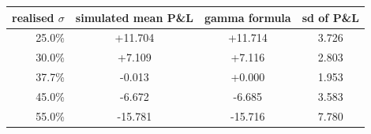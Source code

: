 \begin{tabular}{rccc}
\toprule
realised $\sigma$ & simulated mean P\&L & gamma formula & sd of P\&L \\
\midrule
25.0\% & +11.704 & +11.714 & 3.726 \\
30.0\% & +7.109 & +7.116 & 2.803 \\
37.7\% & -0.013 & +0.000 & 1.953 \\
45.0\% & -6.672 & -6.685 & 3.583 \\
55.0\% & -15.781 & -15.716 & 7.780 \\
\bottomrule
\end{tabular}
